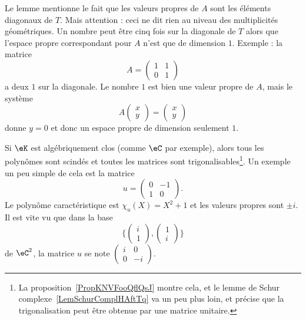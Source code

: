 \begin{remark}
	Le lemme mentionne le fait que les valeurs propres de \( A\) sont les éléments diagonaux de \( T\). Mais attention : ceci ne dit rien au niveau des multiplicités géométriques. Un nombre peut être cinq fois sur la diagonale de \( T\) alors que l'espace propre correspondant pour \( A\) n'est que de dimension \( 1\). Exemple : la matrice
	\begin{equation}
		A=\begin{pmatrix}
			1 & 1 \\
			0 & 1
		\end{pmatrix}
	\end{equation}
	a deux \( 1\) sur la diagonale. Le nombre \( 1\) est bien une valeur propre de \( A\), mais le système
	\begin{equation}
		A\begin{pmatrix}
			x \\
			y
		\end{pmatrix}=\begin{pmatrix}
			x \\
			y
		\end{pmatrix}
	\end{equation}
	donne \( y=0\) et donc un espace propre de dimension seulement \( 1\).
\end{remark}

\begin{remark}  \label{RemXFZTooXkGzQg}
	Si \( \eK\) est algébriquement clos (comme \( \eC\) par exemple), alors tous les polynômes sont scindés et toutes les matrices sont trigonalisables\footnote{La proposition~\ref{PropKNVFooQflQsJ} montre cela, et le lemme de Schur complexe~\ref{LemSchurComplHAftTq} va un peu plus loin, et précise que la trigonalisation peut être obtenue par une matrice unitaire.}. Un exemple un peu simple de cela est la matrice
	\begin{equation}
		u=\begin{pmatrix}
			0 & -1 \\
			1 & 0
		\end{pmatrix}.
	\end{equation}
	Le polynôme caractéristique est \( \chi_u(X)=X^2+1\) et les valeurs propres sont \( \pm i\). Il est vite vu que dans la base
	\begin{equation}
		\{ \begin{pmatrix}
			i \\
			1
		\end{pmatrix}, \begin{pmatrix}
			1 \\
			i
		\end{pmatrix}\}
	\end{equation}
	de \( \eC^2\), la matrice \( u\) se note \( \begin{pmatrix}
		i & 0  \\
		0 & -i
	\end{pmatrix}\).
\end{remark}


